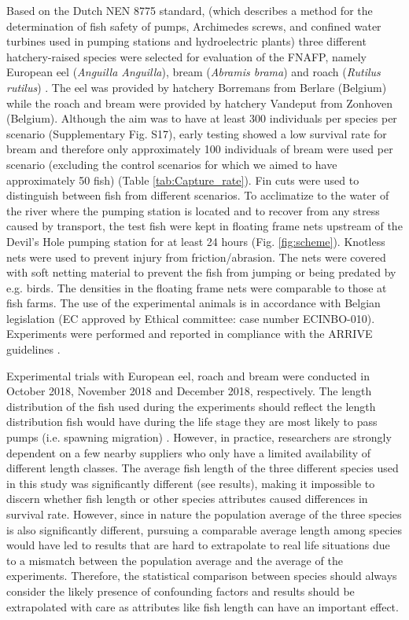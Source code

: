 \documentclass[fleqn,10pt]{wlscirep}
\begin{document}
Based on the Dutch NEN 8775 standard, (which describes a method for the determination of fish safety of pumps, Archimedes screws, and confined water turbines used in pumping stations and hydroelectric plants) three different hatchery-raised species were selected for evaluation of the FNAFP, namely European eel (\textit{Anguilla Anguilla}), bream (\textit{Abramis brama}) and roach (\textit{Rutilus rutilus}) \cite{vanBerkel2020NENPlants}. The eel was provided by hatchery Borremans from Berlare (Belgium) while the roach and bream were provided by hatchery Vandeput from Zonhoven (Belgium). Although the aim was to have at least 300 individuals per species per scenario (Supplementary Fig. S17), early testing showed a low survival rate for bream and therefore only approximately 100 individuals of bream were used per scenario (excluding the control scenarios for which we aimed to have approximately 50 fish) (Table \ref{tab:Capture_rate}). Fin cuts were used to distinguish between fish from different scenarios. To acclimatize to the water of the river where the pumping station is located and to recover from any stress caused by transport, the test fish were kept in floating frame nets upstream of the Devil’s Hole pumping station for at least 24 hours (Fig. \ref{fig:scheme}). Knotless nets were used to prevent injury from friction/abrasion. The nets were covered with soft netting material to prevent the fish from jumping or being predated by e.g. birds. The densities in the floating frame nets were comparable to those at fish farms. The use of the experimental animals is in accordance with Belgian legislation (EC approved by Ethical committee: case number ECINBO-010). Experiments were performed and reported in compliance with the ARRIVE guidelines \cite{PercieduSert2020TheResearch}.

Experimental trials with European eel, roach and bream were conducted in October 2018, November 2018 and December 2018, respectively. The length distribution of the fish used during the experiments should reflect the length distribution fish would have during the life stage they are most likely to pass pumps (i.e. spawning migration) \cite{vanBerkel2020NENPlants}. However, in practice, researchers are strongly dependent on a few nearby suppliers who only have a limited availability of different length classes. The average fish length of the three different species used in this study was significantly different (see results), making it impossible to discern whether fish length or other species attributes caused differences in survival rate. However, since in nature the population average of the three species is also significantly different, pursuing a comparable average length among species would have led to results that are hard to extrapolate to real life situations due to a mismatch between the population average and the average of the experiments. Therefore, the statistical comparison between species should always consider the likely presence of confounding factors and results should be extrapolated with care as attributes like fish length can have an important effect. 
\end{document}
